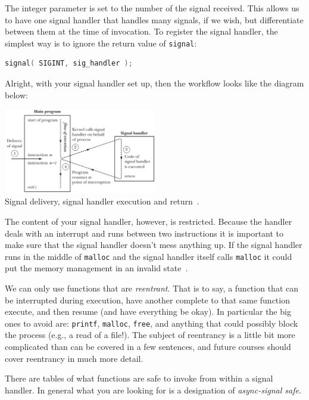 The integer parameter is set to the number of the signal received. This allows us to have one signal handler that handles many signals, if we wish, but differentiate between them at the time of invocation. To register the signal handler, the simplest way is to ignore the return value of \texttt{signal}:

\begin{lstlisting}[language=C]
signal( SIGINT, sig_handler );
\end{lstlisting}

Alright, with your signal handler set up, then the workflow looks like the diagram below:

\begin{center}
\includegraphics[width=0.5\textwidth]{images/sighandler.png}\\
Signal delivery, signal handler execution and return~\cite{lpi}.
\end{center}

The content of your signal handler, however, is restricted. Because the handler deals with an interrupt and runs between two instructions it is important to make sure that the signal handler doesn't mess anything up. If the signal handler runs in the middle of \texttt{malloc} and the signal handler itself calls \texttt{malloc} it could put the memory management in an invalid state~\cite{apunix}. 

We can only use functions that are \textit{reentrant}. That is to say, a function that can be interrupted during execution, have another complete to that same function execute, and then resume (and have everything be okay). In particular the big ones to avoid are: \texttt{printf}, \texttt{malloc}, \texttt{free}, and anything that could possibly block the process (e.g., a read of a file!). The subject of reentrancy is a little bit more complicated than can be covered in a few sentences, and future courses should cover reentrancy in much more detail.

There are tables of what functions are safe to invoke from within a signal handler. In general what you are looking for is a designation of \textit{async-signal safe}. 

